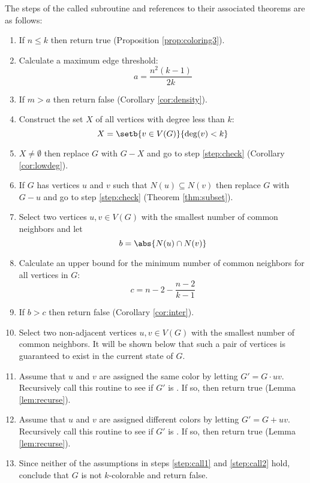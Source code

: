 The steps of the called subroutine and references to their associated theorems are as follows:

\begin{enumerate}
\item \label{step:check} If \(n\le k\) then return true (Proposition \ref{prop:coloring3}).

\item \label{step:dencalc} Calculate a maximum edge threshold:
  \[a=\frac{n^2(k-1)}{2k}\]

\item \label{step:density} If \(m>a\) then return false (Corollary \ref{cor:density}).

\item \label{step:smallcalc} Construct the set \(X\) of all vertices with degree less than \(k\):
  \[X=\setb{v\in V(G)}{\deg(v)<k}\]

\item \label{step:small} \(X\ne\emptyset\) then replace \(G\) with \(G-X\) and go to step \ref{step:check}
  (Corollary \ref{cor:lowdeg}).

\item \label{step:neighbor} If \(G\) has vertices \(u\) and \(v\) such that \(N(u)\subseteq N(v)\) then replace
  \(G\) with \(G-u\) and go to step \ref{step:check} (Theorem \ref{thm:subset}).

\item \label{step:select} Select two vertices \(u,v\in V(G)\) with the smallest number of common neighbors and let
  \[b=\abs{N(u)\cap N(v)}\]

\item \label{step:neighcalc} Calculate an upper bound for the minimum number of common neighbors for all vertices
  in \(G\):
  \[c=n-2-\frac{n-2}{k-1}\]

\item \label{step:common} If \(b>c\) then return false (Corollary \ref{cor:inter}).

\item \label{step:select2} Select two non-adjacent vertices \(u,v\in V(G)\) with the smallest number of common
  neighbors.  It will be shown below that such a pair of vertices is guaranteed to exist in the current state of
  \(G\).

\item \label{step:call1} Assume that \(u\) and \(v\) are assigned the same color by letting \(G'=G\cdot uv\).
  Recursively call this routine to see if \(G'\) is .  If so, then return true (Lemma
  \ref{lem:recurse}).

\item \label{step:call2} Assume that \(u\) and \(v\) are assigned different colors by letting \(G'=G+uv\).
  Recursively call this routine to see if \(G'\) is .  If so, then return true (Lemma
  \ref{lem:recurse}).

\item \label{step:fail} Since neither of the assumptions in steps \ref{step:call1} and \ref{step:call2} hold,
  conclude that \(G\) is not \(k\)-colorable and return false.
\end{enumerate}

